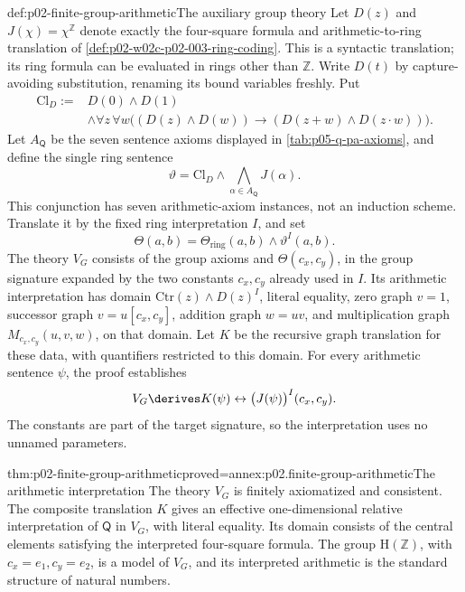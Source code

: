\begin{hbdefinition}{def:p02-finite-group-arithmetic}{The auxiliary group theory}
Let \(D(z)\) and \(J(\chi)=\chi^{\mathbb Z}\) denote exactly the
four-square formula and arithmetic-to-ring translation of
\cref{def:p02-w02c-p02-003-ring-coding}. This is a syntactic translation;
its ring formula can be evaluated in rings other than \(\mathbb Z\).
Write \(D(t)\) by capture-avoiding substitution, renaming its bound
variables freshly. Put
\[
 \begin{aligned}
 \mathrm{Cl}_D := {}&D(0)\land D(1)\\
 &\land\forall z\,\forall w\bigl((D(z)\land D(w))\to
                   (D(z+w)\land D(z\cdot w))\bigr).
 \end{aligned}
\]
Let \(A_{\mathsf Q}\) be the seven sentence axioms displayed in
\cref{tab:p05-q-pa-axioms}, and define the single ring sentence
\[
 \vartheta=\mathrm{Cl}_D\land
                         \bigwedge_{\alpha\in A_{\mathsf Q}}J(\alpha).
\]
This conjunction has seven arithmetic-axiom instances, not an induction
scheme. Translate it by the fixed ring interpretation \(I\), and set
\[
 \Theta(a,b)=\Theta_{\mathrm{ring}}(a,b)\land\vartheta^I(a,b).
\]
The theory \(V_G\) consists of the group axioms and
\(\Theta(c_x,c_y)\), in the group signature expanded by the two constants
\(c_x,c_y\) already used in \(I\). Its arithmetic interpretation has
domain \(\mathrm{Ctr}(z)\land D(z)^I\), literal equality, zero graph
\(v=1\), successor graph \(v=u[c_x,c_y]\), addition graph \(w=uv\),
and multiplication graph \(M_{c_x,c_y}(u,v,w)\), on that domain.
Let \(K\) be the recursive graph translation for these data, with
quantifiers restricted to this domain. For every arithmetic sentence
\(\psi\), the proof establishes
\[
 V_G\derives K(\psi)\leftrightarrow
                         \bigl(J(\psi)\bigr)^I(c_x,c_y).
\]
The constants are part of the target signature, so the interpretation
uses no unnamed parameters.
\end{hbdefinition}

\begin{hbtheorem}{thm:p02-finite-group-arithmetic}{proved=annex:p02.finite-group-arithmetic}{The arithmetic interpretation}
The theory \(V_G\) is finitely axiomatized and consistent. The composite
translation \(K\) gives an effective one-dimensional relative
interpretation of \(\mathsf Q\) in \(V_G\), with literal equality.
Its domain consists of the central elements satisfying the interpreted
four-square formula. The group \(\mathrm H(\mathbb Z)\), with
\(c_x=e_1,c_y=e_2\), is a model of \(V_G\), and its interpreted arithmetic is the
standard structure of natural numbers.
\end{hbtheorem}

